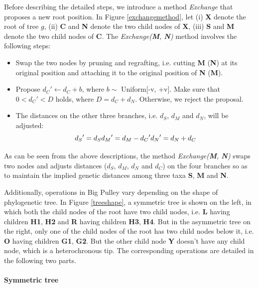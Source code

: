 \documentclass{bmcart}
\begin{document}
Before describing the detailed steps, we introduce a method \textit{Exchange} that proposes a new root position. In Figure \ref{exchangemethod}, let (i) \textbf{X} denote the root of tree $g$, (ii) \textbf{C} and \textbf{N} denote the two child nodes of \textbf{X}, (iii) \textbf{S} and \textbf{M} denote the two child nodes of \textbf{C}. The \textit{Exchange(\textbf{M}, \textbf{N})} method involves the following steps:
\begin{itemize}
\item Swap the two nodes by pruning and regrafting, i.e. cutting \textbf{M} (\textbf{N}) at its original position and attaching it to the original position of \textbf{N} (\textbf{M}).
\item Propose ${d_C}' \leftarrow {d_C} + b$, where $b \sim$ Uniform[-v, +v]. Make sure that $0 < {d_C}' < D$ holds, where $D = {d_C} + {d_{N}}$. Otherwise, we reject the proposal.
\item The distances on the other three branches, i.e. $d_S$, $d_{M}$ and $d_{N}$, will be adjusted:
\begin{equation}\label{big_dis}
{d_S}' = {d_S}\\
{d_{M}}' = {d_{M}} - {d_C}'\\
{d_{N}}' = {d_{N}} + {d_C}
\end{equation}
\end{itemize}

As can be seen from the above descriptions, the method \textit{Exchange(\textbf{M}, \textbf{N})} swaps two nodes and adjusts distances ($d_S$, $d_{M}$, $d_{N}$ and $d_{C}$) on the four branches so as to maintain the implied genetic distances among three taxa \textbf{S}, \textbf{M} and \textbf{N}.

Additionally, operations in Big Pulley vary depending on the shape of phylogenetic tree. In Figure \ref{treeshape}, a symmetric tree is shown on the left, in which both the child nodes of the root have two child nodes, i.e. \textbf{L} having children \textbf{H1}, \textbf{H2} and \textbf{R} having children \textbf{H3}, \textbf{H4}. But in the asymmetric tree on the right, only one of the child nodes of the root has two child nodes below it, i.e. \textbf{O} having children \textbf{G1}, \textbf{G2}. But the other child node \textbf{Y} doesn't have any child node, which is a heterochronous tip. The corresponding operations are detailed in the following two parts.
\paragraph*{Symmetric tree}
\end{document}
